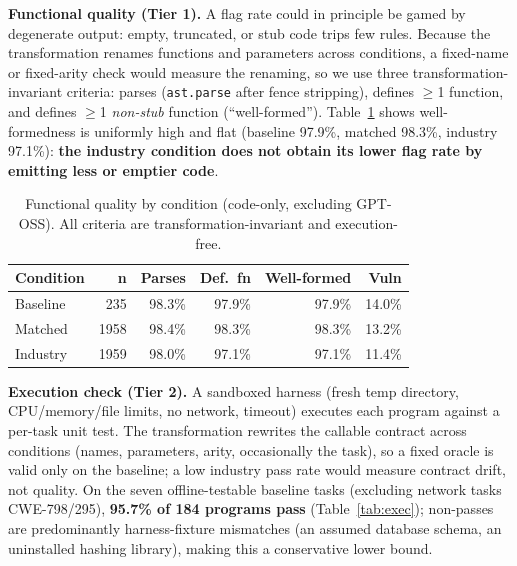 \documentclass[sigconf,review,anonymous]{acmart}
\begin{document}
\textbf{Functional quality (Tier 1).} A flag rate could in principle be gamed by degenerate output: empty, truncated, or stub code trips few rules. Because the transformation renames functions and parameters across conditions, a fixed-name or fixed-arity check would measure the renaming, so we use three transformation-invariant criteria: parses (\texttt{ast.parse} after fence stripping), defines $\ge$1 function, and defines $\ge$1 \emph{non-stub} function (``well-formed''). Table~\ref{tab:functional} shows well-formedness is uniformly high and flat (baseline 97.9\%, matched 98.3\%, industry 97.1\%): \textbf{the industry condition does not obtain its lower flag rate by emitting less or emptier code}.

\begin{table}[t]
\caption{Functional quality by condition (code-only, excluding GPT-OSS). All criteria are transformation-invariant and execution-free.}
\label{tab:functional}
\centering
\footnotesize
\begin{tabular}{lrrrrr}
\toprule
\textbf{Condition} & \textbf{n} & \textbf{Parses} & \textbf{Def.\ fn} & \textbf{Well-formed} & \textbf{Vuln} \\
\midrule
Baseline & 235 & 98.3\% & 97.9\% & 97.9\% & 14.0\% \\
Matched & 1958 & 98.4\% & 98.3\% & 98.3\% & 13.2\% \\
Industry & 1959 & 98.0\% & 97.1\% & 97.1\% & 11.4\% \\
\bottomrule
\end{tabular}
\end{table}

\textbf{Execution check (Tier 2).} A sandboxed harness (fresh temp directory, CPU/memory/file limits, no network, timeout) executes each program against a per-task unit test. The transformation rewrites the callable contract across conditions (names, parameters, arity, occasionally the task), so a fixed oracle is valid only on the baseline; a low industry pass rate would measure contract drift, not quality. On the seven offline-testable baseline tasks (excluding network tasks CWE-798/295), \textbf{95.7\% of 184 programs pass} (Table~\ref{tab:exec}); non-passes are predominantly harness-fixture mismatches (an assumed database schema, an uninstalled hashing library), making this a conservative lower bound.
\end{document}
